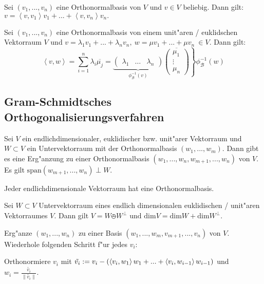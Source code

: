 \documentclass[8pt, a4paper, twocolumn, landscape]{article}
\begin{document}
\begin{remark}
Sei $(v_1, ..., v_n)$ eine Orthonormalbasis von $V$ und $v \in V$ beliebig. Dann gilt:
$
v = \left\langle v, v_1 \right\rangle v_1 + ... + \left\langle v, v_n \right\rangle v_n.
$
\end{remark}

\begin{remark}
Sei $(v_1, ..., v_n)$ eine Orthonormalbasis von einem unit"aren / euklidschen Vektorraum $V$ und $v = \lambda_1 v_1 + ... + \lambda_n v_n, \ w =  \mu v_1 + ... + \mu v_n \  \in V$. Dann gilt:
$$
\left\langle v, w \right\rangle = \sum\limits_{i = 1}^n \lambda_i \overline{\mu_j} = \underbrace{\left(\begin{array}{ccc}\lambda_1 & \hdots & \lambda_n \end{array} \right)}_{\phi_\mathcal{B}^{-1}(v)} \left. \overline{\left(\begin{array}{c}\mu_1  \\ \vdots \\ \mu_n \end{array} \right)} \right\} \phi_\mathcal{B}^{-1}(w)
$$
\end{remark}

\subsection{Gram-Schmidtsches Orthogonalisierungsverfahren}
\begin{theorem} 
Sei $V$ ein endlichdimensionaler, euklidischer bzw. unit"arer Vektorraum und $W \subset V$ ein Untervektorraum mit der Orthonormalbasis $(w_1, ..., w_m)$. Dann gibt es eine Erg"anzung zu einer Orthonormalbasis $(w_1, ..., w_n, w_{m+1}, ..., w_n)$ von $V$. Es gilt $\mathrm{span}(w_{m+1}, ..., w_n) \perp W$.
\end{theorem}

\begin{corollary}
Jeder endlichdimensionale Vektorraum hat eine Orthonormalbasis.
\end{corollary}

\begin{corollary}
Sei $W \subset V$  Untervektorraum eines endlich dimensionalen euklidischen / unit"aren Vektorraumes $V$. Dann gilt
$
V = W \obot W^\perp \text{ und } \mathrm{dim} V = \mathrm{dim} W + \mathrm{dim} W^\perp.
$
\end{corollary}

\begin{remark}
Erg"anze $(w_1, ..., w_n)$ zu einer Basis $(w_1, ..., w_m, v_{m+1}, ..., v_n)$ von $V$. Wiederhole folgenden Schritt f"ur jedes $v_i$:

Orthonormiere $v_i$ mit $\tilde{v_i} := v_i - \left( \left\langle {v_i} , {w_1} \right\rangle  w_1 +  ...  + \left\langle {v_i} , {w_{i-1}} \right\rangle w_{i-1}  \right)$ und $w_i = \frac{\tilde{v_i}}{\|\tilde{v_i}\|}.$
\end{remark}
\end{document}
